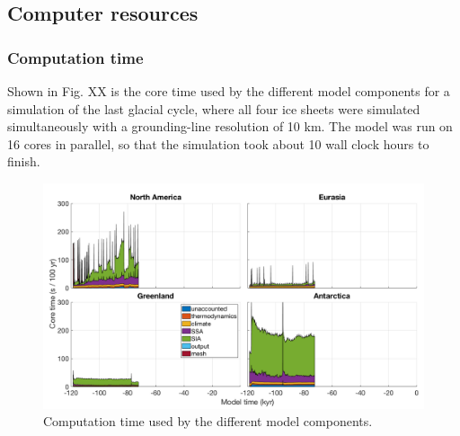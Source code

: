 \documentclass{article}
\begin{document}
\subsection{Computer resources}

\subsubsection{Computation time}

Shown in Fig. XX is the core time used by the different model components for a simulation of the last glacial cycle, where all four ice sheets were simulated simultaneously with a grounding-line resolution of 10 km. The model was run on 16 cores in parallel, so that the simulation took about 10 wall clock hours to finish.

\begin{figure}[h!] \label{fig:resources_time}
  \includegraphics[width=0.9\linewidth]{Fig_resources_time.png}
  \caption{Computation time used by the different model components.}
\end{figure}
\end{document}

